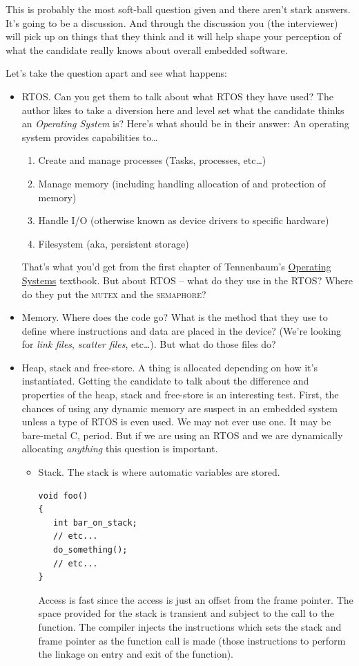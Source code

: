 \documentclass[12pt]{article}
\begin{document}
\begin{enumerate}
\par

This is probably the most soft-ball question given and there aren't 
stark answers.  It's going to be a discussion.   And through the discussion
you (the interviewer) will pick up on things that they think and it will
help shape your perception of what the candidate really knows about
overall embedded software.

Let's take the question apart and see what happens:

\begin{itemize}
\item RTOS.  Can you get them to talk about what RTOS they have used?
The author likes to take a diversion here and level set what the 
candidate thinks an {\textit{Operating System}} is?  Here's what
should be in their answer:  An operating system provides capabilities to\ldots
   \begin{enumerate}
      \item Create and manage processes (Tasks, processes, etc\ldots)
      \item Manage memory (including handling allocation of and protection of memory)
      \item Handle I/O (otherwise known as device drivers to specific hardware)
      \item Filesystem (aka, persistent storage)
   \end{enumerate}
That's what you'd get from the first chapter of Tennenbaum's
{\underline{Operating Systems}} textbook.
But about RTOS -- what do they use in the RTOS?  Where do they put the
{\textsc{mutex}} and the {\textsc{semaphore}}?   
\item Memory.  Where does the code go?  What is the method that they use to
define where instructions and data are placed in the device?  (We're looking for 
{\textit{link files}}, {\textit{scatter files}}, etc\ldots).  But what
do those files do?  
\item Heap, stack and free-store.   A thing is allocated depending on how it's
instantiated.   Getting the candidate to talk about the difference and properties of
the heap, stack and free-store is an interesting test.   First, the chances of 
using any dynamic memory are suspect in an embedded system unless a type of RTOS
is even used.   We may not ever use one.  It may be bare-metal C, period.  But
if we are using an RTOS and we are dynamically allocating {\textit{anything}}
this question is important.

\begin{itemize}
   \item Stack.   The stack is where automatic variables are stored.
\begin{lstlisting}
void foo()
{
   int bar_on_stack;
   // etc...
   do_something();
   // etc...
}
\end{lstlisting} 
Access is fast since  the access is just an offset from the frame pointer.  The
space provided for the stack is transient and subject to the call to the function. The
compiler injects the instructions which sets the stack and frame pointer as the function 
call is made (those instructions to perform the linkage on entry and exit of the function).


\end{itemize}
\end{itemize}
\end{enumerate}
\end{document}

